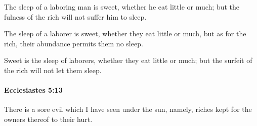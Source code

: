 			\begin{versebox}
					\item[BHS] 
					\item[LXX] 
					\item[ASV] The sleep of a laboring man is sweet, whether he eat little or much; but the fulness of the rich will not suffer him to sleep.
					\item[NIV] The sleep of a laborer is sweet, whether they eat little or much, but as for the rich, their abundance permits them no sleep.
					\item[NRSV] Sweet is the sleep of laborers, whether they eat little or much; but the surfeit of the rich will not let them sleep.
			\end{versebox}

		\paragraph{Ecclesiastes 5:13} %
			\label{ECCLESIASTES-5-13}

			There is a sore evil which I have seen under the sun, namely, riches kept for the owners thereof to their hurt.

